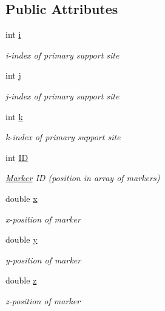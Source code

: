 \subsection*{Public Attributes}
\begin{DoxyCompactItemize}
\item 
int \hyperlink{class_marker_data_abb9f15d2132f7007cf0612d53cd969db}{i}
\begin{DoxyCompactList}\small\item\em i-\/index of primary support site \end{DoxyCompactList}\item 
int \hyperlink{class_marker_data_ae48473a1571656cf8f02403cb42a4adc}{j}
\begin{DoxyCompactList}\small\item\em j-\/index of primary support site \end{DoxyCompactList}\item 
int \hyperlink{class_marker_data_a66183b4e9a166279551f4c180d0d71c8}{k}
\begin{DoxyCompactList}\small\item\em k-\/index of primary support site \end{DoxyCompactList}\item 
int \hyperlink{class_marker_data_aae16e1f3245f8ef95ed6170e3775669d}{ID}
\begin{DoxyCompactList}\small\item\em \hyperlink{class_marker}{Marker} ID (position in array of markers) \end{DoxyCompactList}\item 
double \hyperlink{class_marker_data_aade1e2f618efa75989831f028db027cd}{x}
\begin{DoxyCompactList}\small\item\em x-\/position of marker \end{DoxyCompactList}\item 
double \hyperlink{class_marker_data_a9b10ce07e886a94fc10e097b2cef2265}{y}
\begin{DoxyCompactList}\small\item\em y-\/position of marker \end{DoxyCompactList}\item 
double \hyperlink{class_marker_data_adc00ff164746747a7b379a94abf8a2df}{z}
\begin{DoxyCompactList}\small\item\em z-\/position of marker \end{DoxyCompactList}\end{DoxyCompactItemize}


